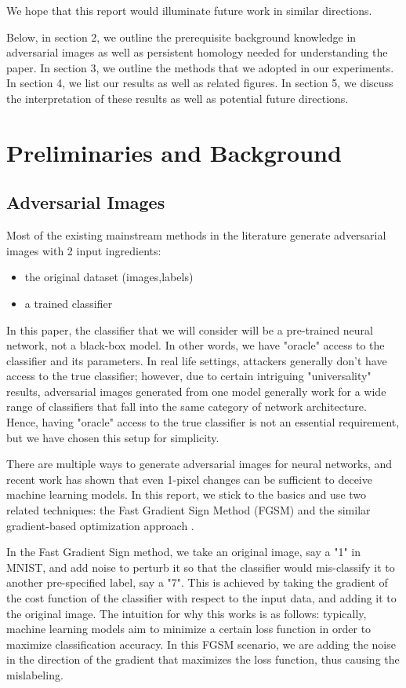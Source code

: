 \documentclass[twoside,twocolumn]{article}
\begin{document}
We hope that this report would illuminate future work in similar directions. 

Below, in section 2, we outline the prerequisite background knowledge in adversarial images as well as persistent homology needed for understanding the paper. In section 3, we outline the methods that we adopted in our experiments. In section 4, we list our results as well as related figures. In section 5, we discuss the interpretation of these results as well as potential future directions. 


\section{Preliminaries and Background}

\subsection{Adversarial Images}

Most of the existing mainstream methods in the literature generate adversarial images with 2 input ingredients: 
\begin{itemize}
    \item the original dataset (images,labels)
    \item a trained classifier
\end{itemize}
In this paper, the classifier that we will consider will be a pre-trained neural network, not a black-box model. In other words, we have "oracle" access to the classifier and its parameters. In real life settings, attackers generally don't have access to the true classifier; however, due to certain intriguing "universality" results, adversarial images generated from one model generally work for a wide range of classifiers that fall into the same category of network architecture. Hence, having "oracle" access to the true classifier is not an essential requirement, but we have chosen this setup for simplicity. 

There are multiple ways to generate adversarial images for neural networks, and recent work has shown that even 1-pixel changes can be sufficient to deceive machine learning models. In this report, we stick to the basics and use two related techniques: the Fast Gradient Sign Method (FGSM) \cite{goodfellow2014} and the similar gradient-based optimization approach \cite{szegedy2013}.

In the Fast Gradient Sign method, we take an original image, say a "1" in MNIST, and add noise to perturb it so that the classifier would mis-classify it to another pre-specified label, say a "7". This is achieved by taking the gradient of the cost function of the classifier with respect to the input data, and adding it to the original image. The intuition for why this works is as follows: typically, machine learning models aim to minimize a certain loss function in order to maximize classification accuracy. In this FGSM scenario, we are adding the noise in the direction of the gradient that maximizes the loss function, thus causing the mislabeling. 
\end{document}
